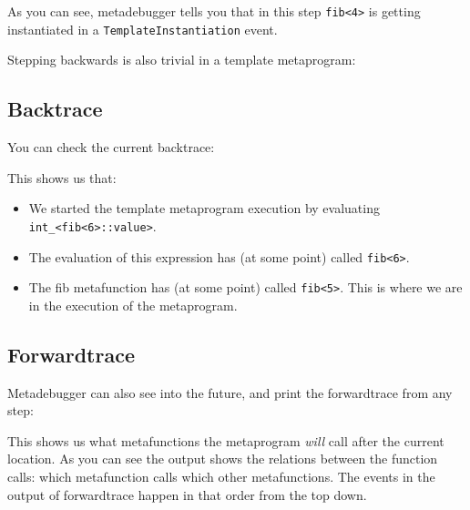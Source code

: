 \begin{figure}[H]

\end{figure}

As you can see, metadebugger tells you that in this step \texttt{fib<4>} is
getting instantiated in a \texttt{TemplateInstantiation} event.

Stepping backwards is also trivial in a template metaprogram:

\begin{figure}[H]

\end{figure}

\subsection{Backtrace}

You can check the current backtrace:

\begin{figure}[H]

\end{figure}

This shows us that:

\begin{itemize}
    \item
        We started the template metaprogram execution by evaluating
        \texttt{int\_<fib<6>::value>}.
    \item
        The evaluation of this expression has (at some point) called
        \texttt{fib<6>}.
    \item
        The fib metafunction has (at some point) called \texttt{fib<5>}.
        This is where we are in the execution of the metaprogram.
\end{itemize}

\subsection{Forwardtrace}

Metadebugger can also see into the future, and print the forwardtrace from any
step:

\begin{figure}[H]

\end{figure}

This shows us what metafunctions the metaprogram \textit{will} call after the
current location. As you can see the output shows the relations between the
function calls: which metafunction calls which other metafunctions. The events
in the output of forwardtrace happen in that order from the top down.

